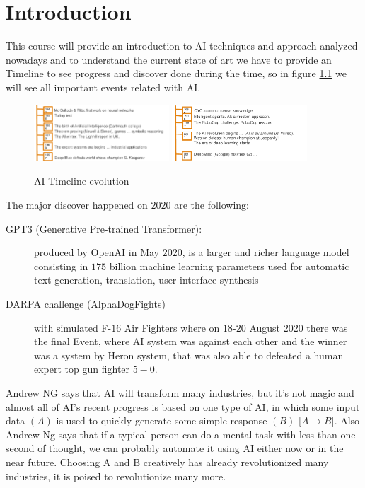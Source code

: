 \chapter{Introduction}
This course will provide an introduction to AI techniques and approach analyzed nowadays and to understand
the current state of art we have to provide an Timeline to see progress and discover done during the time,
so in figure \ref{img:timeline} we will see all important events related with AI.

\begin{figure}
    \includegraphics[width=0.45\textwidth]{Images/timeline}
    \includegraphics[width=0.45\textwidth]{Images/timeline2}
    \caption{AI Timeline evolution}
    \label{img:timeline}
\end{figure}
The major discover happened on $2020$ are the following:
\begin{description}
    \item [GPT3 (Generative Pre-trained Transformer): ] produced by OpenAI in May $2020$, is 
           a larger and richer language model consisting in $175$ billion machine learning parameters
           used for automatic text generation, translation, user interface synthesis
    \item [DARPA challenge (AlphaDogFights)] with simulated F-$16$ Air Fighters where on $18$-$20$ August $2020$
           there was the final Event, where AI system was against each other and the winner was a system by 
           Heron system, that was also able to defeated a human expert top gun fighter $5-0$.
\end{description}
Andrew NG says that AI will transform many industries, but it’s not magic and 
almost all of AI’s recent progress is based on one type of AI, in which some input data $(A)$ is used to
quickly generate some simple response $(B)$ [$A \to B$].\newline
Also Andrew Ng says that if a typical person can do a mental task with less than one second of thought,
we can probably automate it using AI either now or in the near future.\newline
Choosing A and B creatively has already revolutionized many industries, it is poised to
revolutionize many more.

